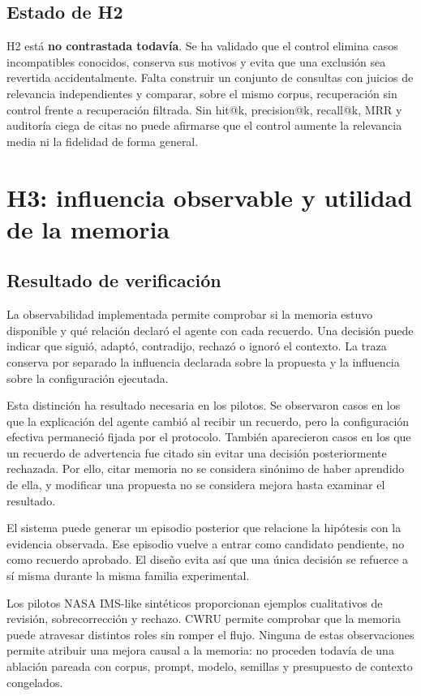 \subsection{Estado de H2}

H2 está \textbf{no contrastada todavía}. Se ha validado que el control elimina
casos incompatibles conocidos, conserva sus motivos y evita que una exclusión
sea revertida accidentalmente. Falta construir un conjunto de consultas con
juicios de relevancia independientes y comparar, sobre el mismo corpus,
recuperación sin control frente a recuperación filtrada. Sin hit@k,
precision@k, recall@k, MRR y auditoría ciega de citas no puede afirmarse que el
control aumente la relevancia media ni la fidelidad de forma general.

\section{H3: influencia observable y utilidad de la memoria}

\subsection{Resultado de verificación}

La observabilidad implementada permite comprobar si la memoria estuvo
disponible y qué relación declaró el agente con cada recuerdo. Una decisión
puede indicar que siguió, adaptó, contradijo, rechazó o ignoró el contexto. La
traza conserva por separado la influencia declarada sobre la propuesta y la
influencia sobre la configuración ejecutada.

Esta distinción ha resultado necesaria en los pilotos. Se observaron casos en
los que la explicación del agente cambió al recibir un recuerdo, pero la
configuración efectiva permaneció fijada por el protocolo. También aparecieron
casos en los que un recuerdo de advertencia fue citado sin evitar una decisión
posteriormente rechazada. Por ello, citar memoria no se considera sinónimo de
haber aprendido de ella, y modificar una propuesta no se considera mejora hasta
examinar el resultado.

El sistema puede generar un episodio posterior que relacione la hipótesis con
la evidencia observada. Ese episodio vuelve a entrar como candidato pendiente,
no como recuerdo aprobado. El diseño evita así que una única decisión se
refuerce a sí misma durante la misma familia experimental.

Los pilotos NASA IMS-like sintéticos proporcionan ejemplos cualitativos de
revisión, sobrecorrección y rechazo. CWRU permite comprobar que la memoria puede
atravesar distintos roles sin romper el flujo. Ninguna de estas observaciones
permite atribuir una mejora causal a la memoria: no proceden todavía de una
ablación pareada con corpus, prompt, modelo, semillas y presupuesto de contexto
congelados.


